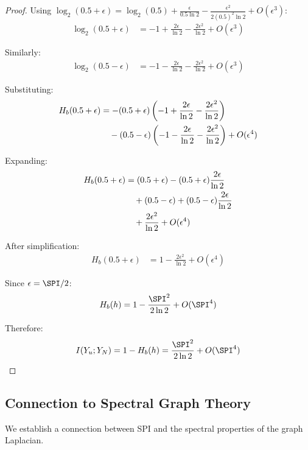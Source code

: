 \begin{proof}
Using $\log_2(0.5 + \epsilon) = \log_2(0.5) + \frac{\epsilon}{0.5 \ln 2} - \frac{\epsilon^2}{2(0.5)^2 \ln 2} + O(\epsilon^3)$:
\begin{align}
\log_2(0.5 + \epsilon) &= -1 + \frac{2\epsilon}{\ln 2} - \frac{2\epsilon^2}{\ln 2} + O(\epsilon^3)
\end{align}

Similarly:
\begin{align}
\log_2(0.5 - \epsilon) &= -1 - \frac{2\epsilon}{\ln 2} - \frac{2\epsilon^2}{\ln 2} + O(\epsilon^3)
\end{align}

Substituting:
\begin{align}
H_b(0.5 + \epsilon) &= -(0.5 + \epsilon)\left(-1 + \frac{2\epsilon}{\ln 2} - \frac{2\epsilon^2}{\ln 2}\right) \notag \\
&\quad - (0.5 - \epsilon)\left(-1 - \frac{2\epsilon}{\ln 2} - \frac{2\epsilon^2}{\ln 2}\right) + O(\epsilon^4)
\end{align}

Expanding:
\begin{align}
H_b(0.5 + \epsilon) &= (0.5 + \epsilon) - (0.5 + \epsilon)\frac{2\epsilon}{\ln 2} \notag \\
&\quad + (0.5 - \epsilon) + (0.5 - \epsilon)\frac{2\epsilon}{\ln 2} \notag \\
&\quad + \frac{2\epsilon^2}{\ln 2} + O(\epsilon^4)
\end{align}

After simplification:
\begin{align}
H_b(0.5 + \epsilon) &= 1 - \frac{2\epsilon^2}{\ln 2} + O(\epsilon^4)
\end{align}

Since $\epsilon = \SPI/2$:
\begin{equation}
H_b(h) = 1 - \frac{\SPI^2}{2\ln 2} + O(\SPI^4)
\end{equation}

Therefore:
\begin{equation}
I(Y_u; Y_N) = 1 - H_b(h) = \frac{\SPI^2}{2\ln 2} + O(\SPI^4) \qedhere
\end{equation}
\end{proof}

\subsection{Connection to Spectral Graph Theory}

We establish a connection between SPI and the spectral properties of the graph Laplacian.

